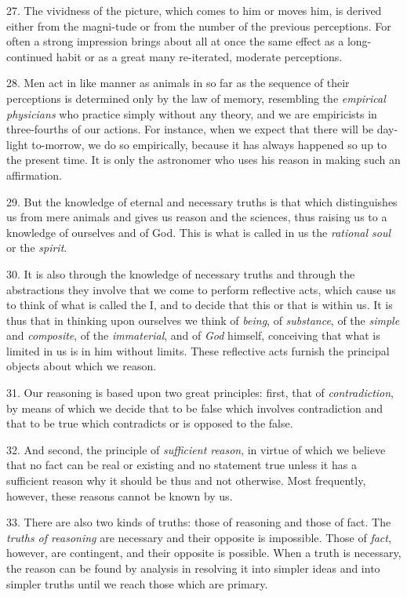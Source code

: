 27. The vividness of the picture, which comes to him or moves him, is
derived either from the magni-tude or from the number of the
previous perceptions. For often a strong impression brings about all
at once the same effect as a long-continued habit or as a great many
re-iterated, moderate perceptions.

28. Men act in like manner as animals in so far as the sequence of
their perceptions is determined only by the law of memory, resembling
the \textit{empirical physicians} who practice simply without any
theory, and we are empiricists in three-fourths of our actions. For
instance, when we expect that there will be day-light to-morrow, we do
so empirically, because it has always happened so up to the present
time. It is only the astronomer who uses his reason in making such an
affirmation.

29. But the knowledge of eternal and necessary truths is that which
distinguishes us from mere animals and gives us reason and the
sciences, thus raising us to a knowledge of ourselves and of God. This
is what is called in us the \textit{rational soul} or the
\textit{spirit}.

30. It is also through the knowledge of necessary truths and through
the abstractions they involve that we come to perform reflective acts,
which cause us to think of what is called the I, and to decide that
this or that is within us. It is thus that in thinking upon ourselves
we think of \textit{being}, of \textit{substance}, of the
\textit{simple} and \textit{composite}, of the \textit{immaterial},
and of \textit{God} himself, conceiving that what is limited in us is
in him without limits. These reflective acts furnish the principal
objects about which we reason.

31. Our reasoning is based upon two great principles: first, that of
\textit{contradiction}, by means of which we decide that to be false
which involves contradiction and that to be true which contradicts or
is opposed to the false.

32. And second, the principle of \textit{sufficient reason},
 in virtue of which we believe that no fact can be real or
existing and no statement true unless it has a sufficient reason why
it should be thus and not otherwise. Most frequently, however, these
reasons cannot be known by us.

33. There are also two kinds of truths: those of reasoning and those
of fact. The \textit{truths of reasoning} are necessary and their
opposite is impossible. Those of \textit{fact}, however, are
contingent, and their opposite is possible. When a truth is necessary,
the reason can be found by analysis in resolving it into simpler ideas
and into simpler truths until we reach those which are primary.

